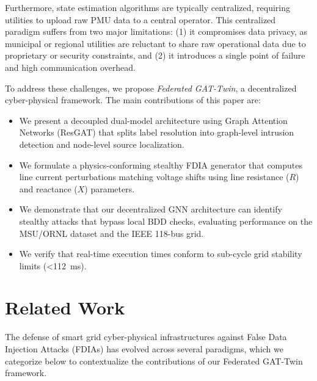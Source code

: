 \documentclass[10pt, a4paper, twocolumn]{article}
\begin{document}
Furthermore, state estimation algorithms are typically centralized, requiring utilities to upload raw PMU data to a central operator. This centralized paradigm suffers from two major limitations: (1) it compromises data privacy, as municipal or regional utilities are reluctant to share raw operational data due to proprietary or security constraints, and (2) it introduces a single point of failure and high communication overhead.

To address these challenges, we propose \textit{Federated GAT-Twin}, a decentralized cyber-physical framework. The main contributions of this paper are:
\begin{itemize}
    \item We present a decoupled dual-model architecture using Graph Attention Networks (ResGAT) that splits label resolution into graph-level intrusion detection and node-level source localization.
    \item We formulate a physics-conforming stealthy FDIA generator that computes line current perturbations matching voltage shifts using line resistance ($R$) and reactance ($X$) parameters.
    \item We demonstrate that our decentralized GNN architecture can identify stealthy attacks that bypass local BDD checks, evaluating performance on the MSU/ORNL dataset and the IEEE 118-bus grid.
    \item We verify that real-time execution times conform to sub-cycle grid stability limits (<112~ms).
\end{itemize}

\section{Related Work}
The defense of smart grid cyber-physical infrastructures against False Data Injection Attacks (FDIAs) has evolved across several paradigms, which we categorize below to contextualize the contributions of our Federated GAT-Twin framework.
\end{document}
